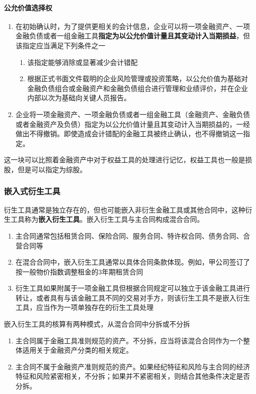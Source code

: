\documentclass[UTF8,12pt]{ctexart}
\numberwithin{equation}{section} %
\numberwithin{figure}{section}
\numberwithin{table}{section}
\begin{document}
	\paragraph{公允价值选择权}
	\begin{enumerate}
		\item 在初始确认时，为了提供更相关的会计信息，企业可以将一项金融资产、一项金融负债或者一组金融工具\textbf{指定为以公允价值计量且其变动计入当期损益}，但该指定应当满足下列条件之一
		\begin{enumerate}
			\item 该指定能够消除或显著减少会计错配
			
			\item 根据正式书面文件载明的企业风险管理或投资策略，以公允价值为基础对金融负债组合或金融资产和金融负债组合进行管理和业绩评价，并在企业内部以次为基础向关键人员报告。
		\end{enumerate}
		
		\item 企业将一项金融资产、一项金融负债或者一组金融工具（金融资产、金融负债或者金融资产及负债）指定为以公允价值计量且其变动计入当期损益的，一经做出不得撤销。即使造成会计错配的金融工具被终止确认，也不得撤销这一指定。
	\end{enumerate}
	
	这一块可以比照着金融资产中对于权益工具的处理进行记忆，权益工具也一般是损股，但是可以指定为综股。
	
	\subsubsection{嵌入式衍生工具}
	衍生工具通常是独立存在的，但也可能嵌入非衍生金融工具或其他合同中，这种衍生工具称为\textbf{嵌入衍生工具}。嵌入衍生工具与主合同构成混合合同。
	\begin{enumerate}
		\item 主合同通常包括租赁合同、保险合同、服务合同、特许权合同、债务合同、合营合同等
		
		\item 在混合合同中，嵌入衍生工具通常以具体合同条款体现。例如，甲公司签订了按一般物价指数调整租金的3年期租赁合同
		
		\item 衍生工具如果附属于一项金融工具但根据合同规定可以独立于该金融工具进行转让，或者具有与该金融工具不同的交易对手方，则该衍生工具不是嵌入衍生工具，应当作为一项单独存在的衍生工具处理
	\end{enumerate}
	
	嵌入衍生工具的核算有两种模式，从混合合同中分拆或不分拆
	\begin{enumerate}
		\item 主合同属于金融工具准则规范的资产。不分拆，应当将该混合合同作为一个整体适用关于金融资产分类的相关规定。
		
		\item 主合同不属于金融资产准则规范的资产。如果经纪特征和风险与主合同的经济特征和风险紧密相关，不分拆；如果并不紧密相关，则结合其他条件决定是否分拆。
	\end{enumerate}
	
\end{document}

